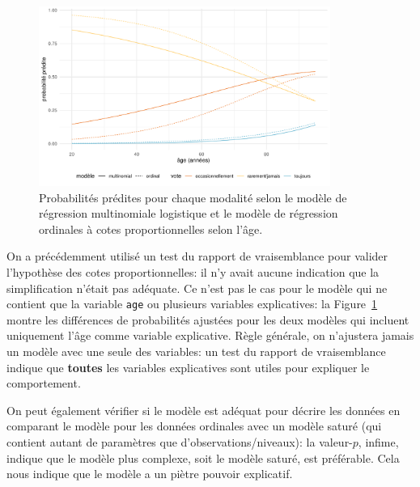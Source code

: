 \documentclass[
  11pt,
  letterpaper,
]{scrbook}
\theoremstyle{definition}
\theoremstyle{remark}
\begin{document}
\begin{figure}[ht!]

{\centering \includegraphics[width=0.85\textwidth,height=\textheight]{./05-reglogistique_files/figure-pdf/fig-predmultinom-1.pdf}

}

\caption{\label{fig-predmultinom}Probabilités prédites pour chaque
modalité selon le modèle de régression multinomiale logistique et le
modèle de régression ordinales à cotes proportionnelles selon l'âge.}

\end{figure}

On a précédemment utilisé un test du rapport de vraisemblance pour
valider l'hypothèse des cotes proportionnelles: il n'y avait aucune
indication que la simplification n'était pas adéquate. Ce n'est pas le
cas pour le modèle qui ne contient que la variable \texttt{age} ou
plusieurs variables explicatives: la Figure~\ref{fig-predmultinom}
montre les différences de probabilités ajustées pour les deux modèles
qui incluent uniquement l'âge comme variable explicative. Règle
générale, on n'ajustera jamais un modèle avec une seule des variables:
un test du rapport de vraisemblance indique que \textbf{toutes} les
variables explicatives sont utiles pour expliquer le comportement.

On peut également vérifier si le modèle est adéquat pour décrire les
données en comparant le modèle pour les données ordinales avec un modèle
saturé (qui contient autant de paramètres que d'observations/niveaux):
la valeur-\(p\), infime, indique que le modèle plus complexe, soit le
modèle saturé, est préférable. Cela nous indique que le modèle a un
piètre pouvoir explicatif.
\end{document}
